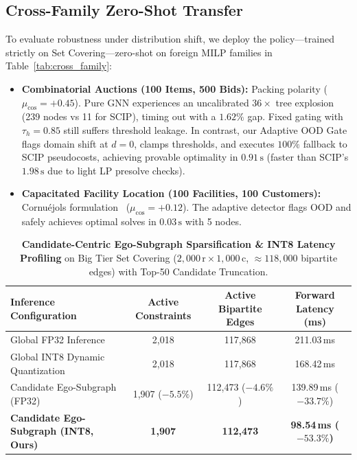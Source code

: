 \documentclass[10pt,twocolumn,letterpaper]{article}
\theoremstyle{plain}
\theoremstyle{definition}
\theoremstyle{remark}
\begin{document}
\subsection{Cross-Family Zero-Shot Transfer}
To evaluate robustness under distribution shift, we deploy the policy—trained strictly on Set Covering—zero-shot on foreign MILP families in Table~\ref{tab:cross_family}:
\begin{itemize}
    \item \textbf{Combinatorial Auctions (100 Items, 500 Bids):} Packing polarity ($\mu_{\text{cos}} = +0.45$). Pure GNN experiences an uncalibrated $36\times$ tree explosion (239 nodes vs 11 for SCIP), timing out with a $1.62\%$ gap. Fixed gating with $\tau_h = 0.85$ still suffers threshold leakage. In contrast, our Adaptive OOD Gate flags domain shift at $d=0$, clamps thresholds, and executes $100\%$ fallback to SCIP pseudocosts, achieving provable optimality in $0.91\,\text{s}$ (faster than SCIP's $1.98\,\text{s}$ due to light LP presolve checks).
    \item \textbf{Capacitated Facility Location (100 Facilities, 100 Customers):} Cornu{\'e}jols formulation~\cite{cornuejols1991comparison} ($\mu_{\text{cos}} = +0.12$). The adaptive detector flags OOD and safely achieves optimal solves in $0.03\,\text{s}$ with 5 nodes.
\end{itemize}

\begin{table}[t]
\centering
\caption{\textbf{Candidate-Centric Ego-Subgraph Sparsification \& INT8 Latency Profiling} on Big Tier Set Covering ($2,000\,\text{r} \times 1,000\,\text{c}$, $\approx 118,000$ bipartite edges) with Top-50 Candidate Truncation.}
\label{tab:latency_profile}
\small
\begin{tabular}{lccc}
\toprule
\textbf{Inference Configuration} & \textbf{Active Constraints} & \textbf{Active Bipartite Edges} & \textbf{Forward Latency (ms)} \\
\midrule
Global FP32 Inference & 2,018 & 117,868 & 211.03\,ms \\
Global INT8 Dynamic Quantization & 2,018 & 117,868 & 168.42\,ms \\
Candidate Ego-Subgraph (FP32) & 1,907 ($-5.5\%$) & 112,473 ($-4.6\%$) & 139.89\,ms ($-33.7\%$) \\
\textbf{Candidate Ego-Subgraph (INT8, Ours)} & \textbf{1,907} & \textbf{112,473} & \textbf{98.54\,ms ($-53.3\%$)} \\
\bottomrule
\end{tabular}
\end{table}
\end{document}
